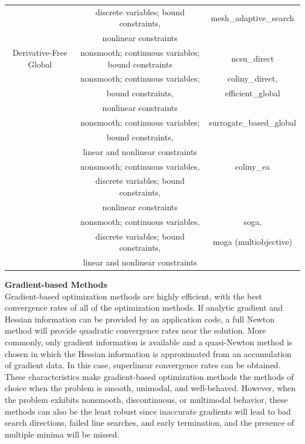 \begin{table}[hbp]
\begin{tabular}{|c|c|c|}
         & discrete variables; bound constraints, & mesh\_adaptive\_search \\
         & nonlinear constraints &  \\
\hline
Derivative-Free Global & nonsmooth; continuous variables; bound constraints
& ncsu\_direct \\
\hline
         & nonsmooth; continuous variables; & coliny\_direct,  \\
         & bound constraints, & efficient\_global \\
         & nonlinear constraints & \\
\hline
         & nonsmooth; continuous variables; & surrogate\_based\_global \\
         & bound constraints, &  \\
         & linear and nonlinear constraints & \\
\hline
         & nonsmooth; continuous variables, & coliny\_ea \\
         & discrete variables; bound constraints, &  \\
         & nonlinear constraints & \\
\hline
         & nonsmooth; continuous variables, & soga, \\
         & discrete variables; bound constraints, & moga (multiobjective) \\
         & linear and nonlinear constraints & \\
\hline
\end{tabular}
\end{table}

{\bf Gradient-based Methods} \\
Gradient-based optimization methods are highly efficient, with the
best convergence rates of all of the optimization methods. If analytic
gradient and Hessian information can be provided by an application
code, a full Newton method will provide quadratic convergence rates
near the solution. More commonly, only gradient information is
available and a quasi-Newton method is chosen in which the Hessian
information is approximated from an accumulation of gradient data. In
this case, superlinear convergence rates can be obtained. These
characteristics make gradient-based optimization methods the methods
of choice when the problem is smooth, unimodal, and
well-behaved. However, when the problem exhibits nonsmooth,
discontinuous, or multimodal behavior, these methods can also be the
least robust since inaccurate gradients will lead to bad search
directions, failed line searches, and early termination, and the
presence of multiple minima will be missed.

